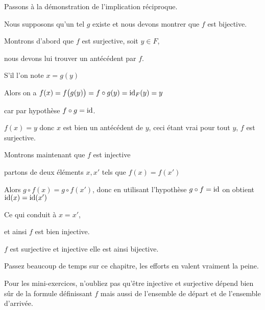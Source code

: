 \diapo

Passons à la démonstration de l'implication réciproque.

\change

Nous supposons qu'un tel $g$ existe et nous devons montrer que $f$ est bijective.

\change

Montrons d'abord que $f$ est surjective, soit $y \in F$, 

nous devons lui trouver un antécédent par $f$.

S'il l'on note $x = g(y)$

\change

Alors on a 
$f(x) = f\big( g(y) \big) = f \circ g(y) = \mathop{\text{id}}\nolimits_F(y)=y$

car par hypothèse $f\circ g = \mathop{\text{id}}\nolimits$.

\change

$f(x)=y$ donc $x$ est bien un antécédent de $y$, ceci étant vrai pour tout $y$, 
 $f$ est surjective.

\change

Montrons maintenant que $f$ est injective

partons de deux éléments $x,x'$ tels que $f(x)=f(x')$

\change


Alors $g\circ f(x)=g\circ f(x')$, donc en utilisant l'hypothèse
$g\circ f= \mathop{\text{id}}\nolimits$ on obtient 
 $\mathop{\text{id}}\nolimits(x)=\mathop{\text{id}}\nolimits(x')$


\change

Ce qui conduit à $x=x'$, 

et ainsi $f$ est bien injective.

$f$ est surjective et injective elle est ainsi bijective.





\diapo

Passez beaucoup de temps sur ce chapitre, les efforts en valent vraiment la peine.


Pour les mini-exercices, n'oubliez pas qu'être injective et surjective 
dépend bien sûr de la formule définissant $f$ mais aussi de l'ensemble
de départ et de l'ensemble d'arrivée.


